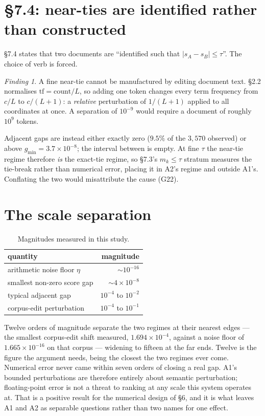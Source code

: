 \documentclass[11pt,a4paper]{article}
\theoremstyle{plain} \newtheorem{proposition}{Proposition} \theoremstyle{remark}
\newtheorem{finding}{Finding}
\newcommand{\addendum}[1]{\textsf{G#1}}
\begin{document}
\section{\texorpdfstring{\S7.4}{Section 7.4}: near-ties are identified rather than constructed}

\S7.4 states that two documents are ``identified such that $|s_A - s_B| \le
\tau$''. The choice of verb is forced.

\begin{finding}\label{find:neartie}
A fine near-tie cannot be manufactured by editing document text. \S2.2 normalises
$\mathrm{tf} = \mathrm{count}/L$, so adding one token changes every term
frequency from $c/L$ to $c/(L+1)$: a \emph{relative} perturbation of $1/(L+1)$
applied to all coordinates at once. A separation of $10^{-9}$ would require a
document of roughly $10^{9}$ tokens.
\end{finding}

Adjacent gaps are instead either exactly zero ($9.5\%$ of the $3{,}570$ observed)
or above $g_{\min} = 3.7\times10^{-8}$; the interval between is empty. At fine
$\tau$ the near-tie
regime therefore \emph{is} the exact-tie regime, so \S7.3's $m_k \le \tau$
stratum measures the tie-break rather than numerical error, placing it in A2's
regime and outside A1's. Conflating the two would misattribute the cause
(\addendum{22}).

\section{The scale separation}

\begin{table}[ht]\centering
\caption{Magnitudes measured in this study.}
\label{tab:scales}
\begin{tabular}{lr}
\toprule
quantity                      & magnitude \\
\midrule
arithmetic noise floor $\eta$ & ${\sim}10^{-16}$ \\
smallest non-zero score gap   & ${\sim}4\times10^{-8}$ \\
typical adjacent gap          & $10^{-4}$ to $10^{-2}$ \\
corpus-edit perturbation      & $10^{-4}$ to $10^{-1}$ \\
\bottomrule
\end{tabular}
\end{table}

Twelve orders of magnitude separate the two regimes at their nearest edges ---
the smallest corpus-edit shift measured, $1.694\times10^{-4}$, against a noise
floor of $1.665\times10^{-16}$ on that corpus --- widening to fifteen at the far
ends. Twelve is the figure the argument needs, being the closest the two regimes
ever come. Numerical error never came within seven orders of closing a real gap.
A1's bounded perturbations are therefore entirely about semantic perturbation;
floating-point error is not a threat to ranking at any scale this system
operates at. That is a positive result for the numerical design of \S6, and it
is what leaves A1 and A2 as separable questions rather than two names for one
effect.
\end{document}
